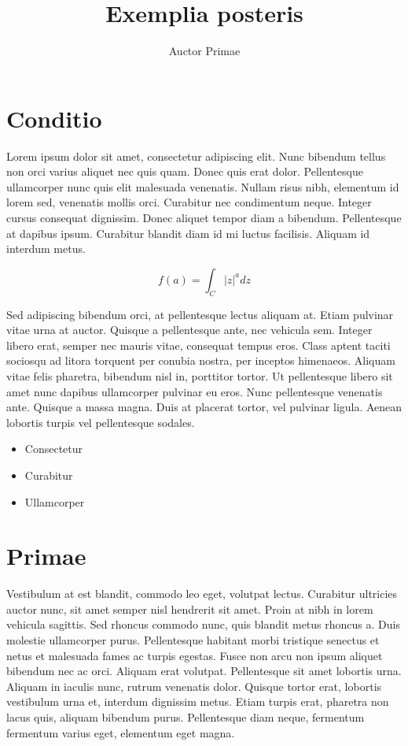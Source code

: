\documentclass[a0paper]{test1}
\title{Exemplia posteris}
\author{Auctor Primae}
\begin{document}
\section*{Conditio}
Lorem ipsum dolor sit amet, consectetur adipiscing elit. Nunc bibendum tellus non orci varius aliquet nec quis quam. Donec quis erat dolor. Pellentesque ullamcorper nunc quis elit malesuada venenatis. Nullam risus nibh, elementum id lorem sed, venenatis mollis orci. Curabitur nec condimentum neque. Integer cursus consequat dignissim. Donec aliquet tempor diam a bibendum. Pellentesque at dapibus ipsum. Curabitur blandit diam id mi luctus facilisis. Aliquam id interdum metus.

\begin{equation}
    f(a) = \int_C |z|^a dz
\end{equation}
    

Sed adipiscing bibendum orci, at pellentesque lectus aliquam at. Etiam pulvinar vitae urna at auctor. Quisque a pellentesque ante, nec vehicula sem. Integer libero erat, semper nec mauris vitae, consequat tempus eros. Class aptent taciti sociosqu ad litora torquent per conubia nostra, per inceptos himenaeos. Aliquam vitae felis pharetra, bibendum nisl in, porttitor tortor. Ut pellentesque libero sit amet nunc dapibus ullamcorper pulvinar eu eros. Nunc pellentesque venenatis ante. Quisque a massa magna. Duis at placerat tortor, vel pulvinar ligula. Aenean lobortis turpis vel pellentesque sodales.

\begin{itemize}
    \item Consectetur
    \item Curabitur
    \item Ullamcorper
\end{itemize}

\section*{Primae}
Vestibulum at est blandit, commodo leo eget, volutpat lectus. Curabitur ultricies auctor nunc, sit amet semper nisl hendrerit sit amet. Proin at nibh in lorem vehicula sagittis. Sed rhoncus commodo nunc, quis blandit metus rhoncus a. Duis molestie ullamcorper purus. Pellentesque habitant morbi tristique senectus et netus et malesuada fames ac turpis egestas. Fusce non arcu non ipsum aliquet bibendum nec ac orci. Aliquam erat volutpat. Pellentesque sit amet lobortis urna. Aliquam in iaculis nunc, rutrum venenatis dolor. Quisque tortor erat, lobortis vestibulum urna et, interdum dignissim metus. Etiam turpis erat, pharetra non lacus quis, aliquam bibendum purus. Pellentesque diam neque, fermentum fermentum varius eget, elementum eget magna.
\end{document}
